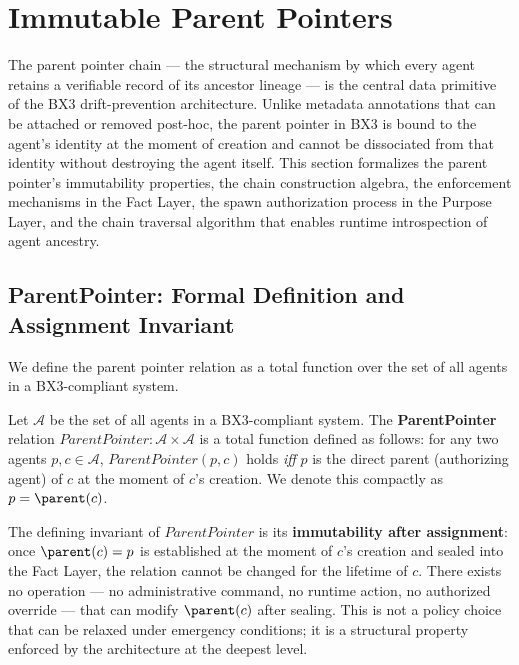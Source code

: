 
\section{Immutable Parent Pointers}
\label{sec:immutable_parent_pointers}

The parent pointer chain — the structural mechanism by which every agent retains a verifiable record of its ancestor lineage — is the central data primitive of the BX3 drift-prevention architecture. Unlike metadata annotations that can be attached or removed post-hoc, the parent pointer in BX3 is bound to the agent's identity at the moment of creation and cannot be dissociated from that identity without destroying the agent itself. This section formalizes the parent pointer's immutability properties, the chain construction algebra, the enforcement mechanisms in the Fact Layer, the spawn authorization process in the Purpose Layer, and the chain traversal algorithm that enables runtime introspection of agent ancestry.

\subsection{ParentPointer: Formal Definition and Assignment Invariant}

We define the parent pointer relation as a total function over the set of all agents in a BX3-compliant system.

\begin{definition}[ParentPointer]
\label{def:parent_pointer}
Let $\mathcal{A}$ be the set of all agents in a BX3-compliant system. The \textbf{ParentPointer} relation $\textit{ParentPointer} : \mathcal{A} \times \mathcal{A}$ is a total function defined as follows: for any two agents $p, c \in \mathcal{A}$, $\textit{ParentPointer}(p, c)$ holds \emph{iff} $p$ is the direct parent (authorizing agent) of $c$ at the moment of $c$'s creation. We denote this compactly as $p = \parent(c)$.
\end{definition}

The defining invariant of $\textit{ParentPointer}$ is its \textbf{immutability after assignment}: once $\parent(c) = p$ is established at the moment of $c$'s creation and sealed into the Fact Layer, the relation cannot be changed for the lifetime of $c$. There exists no operation — no administrative command, no runtime action, no authorized override — that can modify $\parent(c)$ after sealing. This is not a policy choice that can be relaxed under emergency conditions; it is a structural property enforced by the architecture at the deepest level.

